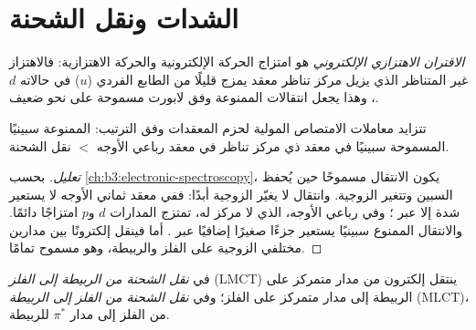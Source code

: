 \section{الشدات ونقل الشحنة}

\begin{definition}\label{def:b3:complex-spectra-magnetism:vibronic-coupling}
\emph{الاقتران الاهتزازي الإلكتروني} هو امتزاج الحركة الإلكترونية 
والحركة الاهتزازية: فالاهتزاز غير المتناظر الذي يزيل مركز
تناظر معقد يمزج قليلًا من الطابع الفردي ($u$) في حالاته $d$،
وهذا يجعل انتقالات  الممنوعة وفق لابورت مسموحة على نحو ضعيف.
\end{definition}

\begin{proposition}\label{prop:b3:complex-spectra-magnetism:intensity-order}
تتزايد معاملات الامتصاص المولية لحزم المعقدات وفق
الترتيب:  الممنوعة سبينيًا  المسموحة سبينيًا في معقد ذي مركز تناظر 
في معقد رباعي الأوجه $<$ نقل الشحنة.
\end{proposition}

\begin{proof}[تعليل]
بحسب \cref{ch:b3:electronic-spectroscopy}، يكون الانتقال مسموحًا حين يُحفظ
السبين وتتغير الزوجية. وانتقال  لا يغيّر الزوجية أبدًا: ففي
معقد ثماني الأوجه لا يستعير شدة إلا عبر ؛ وفي
رباعي الأوجه، الذي لا مركز له، تمتزج المدارات $d$ و$p$ امتزاجًا دائمًا. 
والانتقال الممنوع سبينيًا يستعير جزءًا صغيرًا إضافيًا عبر .
أما  فينقل إلكترونًا بين مدارين مختلفي
الزوجية على الفلز والربيطة، وهو مسموح تمامًا.
\end{proof}

\begin{definition}\label{def:b3:complex-spectra-magnetism:ct}
في \emph{نقل الشحنة من الربيطة إلى الفلز}
(LMCT) ينتقل إلكترون من مدار متمركز على الربيطة إلى مدار متمركز
على الفلز؛ وفي \emph{نقل الشحنة من الفلز إلى الربيطة}
(MLCT)، من الفلز إلى مدار $\pi^*$ للربيطة.
\end{definition}

